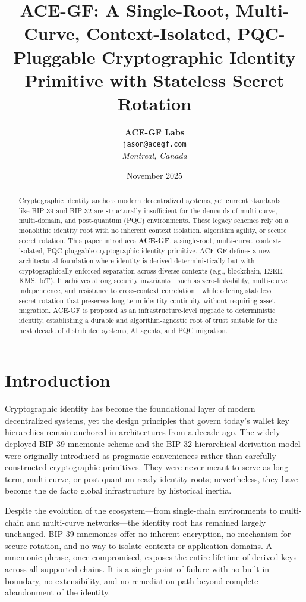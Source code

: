 \documentclass[11pt,a4paper]{article}
\title{ACE-GF: A Single-Root, Multi-Curve, Context-Isolated, PQC-Pluggable Cryptographic Identity Primitive with Stateless Secret Rotation}
\author{
    \textbf{ACE-GF Labs} \\
    \vspace{0.5em}
    \small \texttt{jason@acegf.com} \\
    \small \emph{Montreal, Canada}
}
\date{November 2025} %
\begin{document}
\maketitle

\begin{abstract}
Cryptographic identity anchors modern decentralized systems, yet current standards like BIP-39 and BIP-32 are structurally insufficient for the demands of multi-curve, multi-domain, and post-quantum (PQC) environments. These legacy schemes rely on a monolithic identity root with no inherent context isolation, algorithm agility, or secure secret rotation. This paper introduces \textbf{ACE-GF}, a single-root, multi-curve, context-isolated, PQC-pluggable cryptographic identity primitive. ACE-GF defines a new architectural foundation where identity is derived deterministically but with cryptographically enforced separation across diverse contexts (e.g., blockchain, E2EE, KMS, IoT). It achieves strong security invariants---such as zero-linkability, multi-curve independence, and resistance to cross-context correlation---while offering stateless secret rotation that preserves long-term identity continuity without requiring asset migration. ACE-GF is proposed as an infrastructure-level upgrade to deterministic identity, establishing a durable and algorithm-agnostic root of trust suitable for the next decade of distributed systems, AI agents, and PQC migration.
\end{abstract}


\section{Introduction}
Cryptographic identity has become the foundational layer of modern decentralized systems, yet the design principles that govern today's wallet key hierarchies remain anchored in architectures from a decade ago. The widely deployed BIP-39 mnemonic scheme and the BIP-32 hierarchical derivation model were originally introduced as pragmatic conveniences rather than carefully constructed cryptographic primitives. They were never meant to serve as long-term, multi-curve, or post-quantum-ready identity roots; nevertheless, they have become the de facto global infrastructure by historical inertia.

Despite the evolution of the ecosystem---from single-chain environments to multi-chain and multi-curve networks---the identity root has remained largely unchanged. BIP-39 mnemonics offer no inherent encryption, no mechanism for secure rotation, and no way to isolate contexts or application domains. A mnemonic phrase, once compromised, exposes the entire lifetime of derived keys across all supported chains. It is a single point of failure with no built-in boundary, no extensibility, and no remediation path beyond complete abandonment of the identity.
\end{document}
